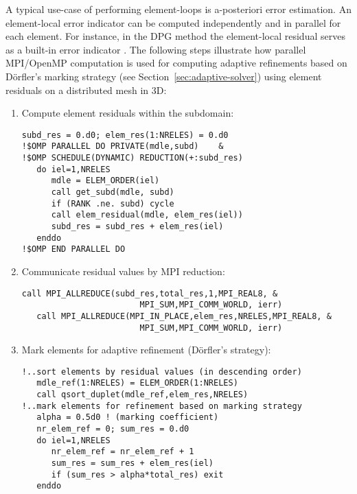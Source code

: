 A typical use-case of performing element-loops is a-posteriori error estimation. An element-local error indicator can be computed independently and in parallel for each element. For instance, in the DPG method the element-local residual serves as a built-in error indicator \cite{demkowicz2017dpg}. The following steps illustrate how parallel MPI/OpenMP computation is used for computing adaptive refinements based on D\"orfler's marking strategy
(see Section~\ref{sec:adaptive-solver}) using element residuals on a distributed mesh in \hp3D:
\begin{enumerate}
\item
	Compute element residuals within the subdomain:
	\begin{lstlisting}[caption=Adaptive refinements based on element residuals: (a) subdomain computation., label={lst:adaptive_refinement_element_loop1}]
   subd_res = 0.d0; elem_res(1:NRELES) = 0.d0
!$OMP PARALLEL DO PRIVATE(mdle,subd)    &
!$OMP SCHEDULE(DYNAMIC) REDUCTION(+:subd_res)
   do iel=1,NRELES
      mdle = ELEM_ORDER(iel)
      call get_subd(mdle, subd)
      if (RANK .ne. subd) cycle
      call elem_residual(mdle, elem_res(iel))
      subd_res = subd_res + elem_res(iel)
   enddo
!$OMP END PARALLEL DO
\end{lstlisting}
\item
	Communicate residual values by MPI reduction:
	\begin{lstlisting}[caption=Adaptive refinements based on element residuals: (b) global communication., label={lst:adaptive_refinement_element_loop2}]
   call MPI_ALLREDUCE(subd_res,total_res,1,MPI_REAL8, &
                        MPI_SUM,MPI_COMM_WORLD, ierr)
   call MPI_ALLREDUCE(MPI_IN_PLACE,elem_res,NRELES,MPI_REAL8, &
                        MPI_SUM,MPI_COMM_WORLD, ierr)
\end{lstlisting}
\item
	Mark elements for adaptive refinement (D\"orfler's strategy):
	\begin{lstlisting}[caption=Adaptive refinements based on element residuals: (c) element marking., label={lst:adaptive_refinement_element_loop3}]
!..sort elements by residual values (in descending order)
   mdle_ref(1:NRELES) = ELEM_ORDER(1:NRELES)
   call qsort_duplet(mdle_ref,elem_res,NRELES)
!..mark elements for refinement based on marking strategy
   alpha = 0.5d0 ! (marking coefficient)
   nr_elem_ref = 0; sum_res = 0.d0
   do iel=1,NRELES
      nr_elem_ref = nr_elem_ref + 1
      sum_res = sum_res + elem_res(iel)
      if (sum_res > alpha*total_res) exit
   enddo

\end{lstlisting}
\end{enumerate}
